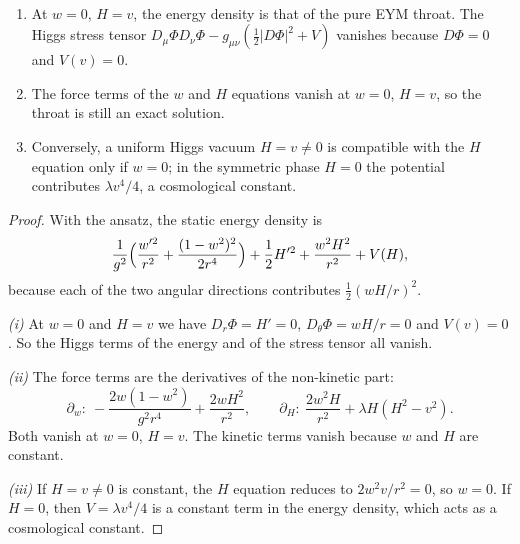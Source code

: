 \begin{proposition}\label{prop:higgsthroat}\ver\
\begin{enumerate}[label=(\roman*)]
\item At $w=0$, $H=v$, the energy density is that of the pure EYM throat. The Higgs stress tensor $D_\mu\Phi D_\nu\Phi-g_{\mu\nu}(\frac12|D\Phi|^2+V)$ vanishes because $D\Phi=0$ and $V(v)=0$.
\item The force terms of the $w$ and $H$ equations vanish at $w=0$, $H=v$, so the throat is still an exact solution.
\item Conversely, a uniform Higgs vacuum $H=v\ne0$ is compatible with the $H$ equation only if $w=0$; in the symmetric phase $H=0$ the potential contributes $\lambda v^4/4$, a cosmological constant.
\end{enumerate}
\end{proposition}
\begin{proof}
With the ansatz, the static energy density is
\[
\frac1{g^2}\Bigl(\frac{w'^2}{r^2}+\frac{(1-w^2)^2}{2r^4}\Bigr)+\frac12H'^2+\frac{w^2H^2}{r^2}+V(H),
\]
because each of the two angular directions contributes $\frac12(wH/r)^2$.

\emph{(i)} At $w=0$ and $H=v$ we have $D_r\Phi=H'=0$, $D_\theta\Phi=wH/r=0$ and $V(v)=0$. So the Higgs terms of the energy and of the stress tensor all vanish.

\emph{(ii)} The force terms are the derivatives of the non-kinetic part:
\[
\partial_w:\ -\frac{2w(1-w^2)}{g^2r^4}+\frac{2wH^2}{r^2},\qquad\partial_H:\ \frac{2w^2H}{r^2}+\lambda H(H^2-v^2).
\]
Both vanish at $w=0$, $H=v$. The kinetic terms vanish because $w$ and $H$ are constant.

\emph{(iii)} If $H=v\ne0$ is constant, the $H$ equation reduces to $2w^2v/r^2=0$, so $w=0$. If $H=0$, then $V=\lambda v^4/4$ is a constant term in the energy density, which acts as a cosmological constant.
\end{proof}


